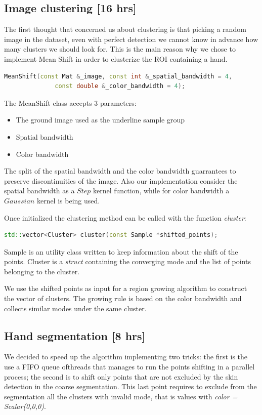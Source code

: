 \subsection{Image clustering [16 hrs]}
The first thought that concerned us about clustering is that picking a random
image in the dataset, even with perfect detection we cannot know in advance how
many clusters we should look for.
This is the main reason why we chose to implement Mean Shift in order to
clusterize the ROI containing a hand.

\begin{lstlisting}[language = c++]
    MeanShift(const Mat &_image, const int &_spatial_bandwidth = 4, 
              const double &_color_bandwidth = 4);
    \end{lstlisting}

The MeanShift class accepts 3 parameters:
\begin{itemize}
    \item The ground image used as the underline sample group
    \item Spatial bandwidth
    \item Color bandwidth
\end{itemize}

The split of the spatial bandwidth and the color bandwidth guarrantees to
preserve discontinuities of the image. Also our implementation consider the 
spatial bandwidth as a $Step$ kernel function, while for color bandwidth
a $Gaussian$ kernel is being used.

Once initialized the clustering method can be called with the function
\textit{cluster}:

\begin{lstlisting}[language = c++]
    std::vector<Cluster> cluster(const Sample *shifted_points);
    \end{lstlisting}

Sample is an utility class written to keep information about the shift of
the points.
Cluster is a \textit{struct} containing the converging mode and the list of
points belonging to the cluster.

We use the shifted points as input for a region growing algorithm to construct
the vector of clusters. The growing rule is based on the color bandwidth and
collects similar modes under the same cluster.

\subsection{Hand segmentation [8 hrs]}
We decided to speed up the algorithm implementing two tricks: the first is the
use a FIFO queue ofthreads that manages to run the points shifting in a
parallel process; the second is to shift only points that are not excluded by
the skin detection in the coarse
segmentation. This last point requires to exclude from the segmentation all the
clusters with invalid mode, that is values with \textit{color = Scalar(0,0,0)}.

